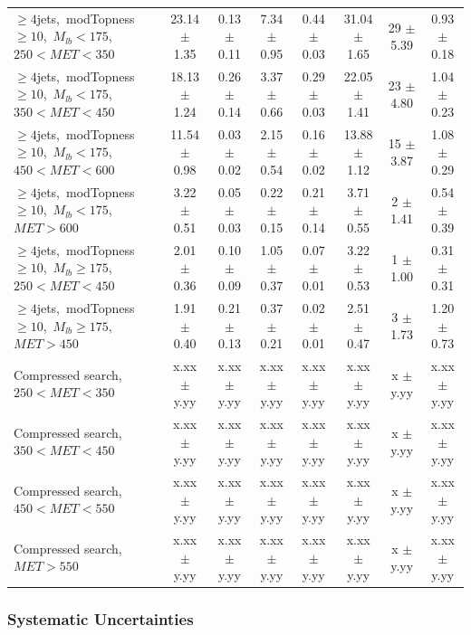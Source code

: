 \begin{table}
{\begin{tabular}{|l|c c c c c|c|c|}
\hline
$\ge4$jets,~modTopness$\ge10$,~$M_{lb}<175$,~$250<MET<350$  & 23.14 $\pm$ 1.35  & 0.13 $\pm$ 0.11  & 7.34 $\pm$ 0.95  & 0.44 $\pm$ 0.03  & 31.04 $\pm$ 1.65  & 29 $\pm$ 5.39  & 0.93 $\pm$ 0.18 \\*
$\ge4$jets,~modTopness$\ge10$,~$M_{lb}<175$,~$350<MET<450$  & 18.13 $\pm$ 1.24  & 0.26 $\pm$ 0.14  & 3.37 $\pm$ 0.66  & 0.29 $\pm$ 0.03  & 22.05 $\pm$ 1.41  & 23 $\pm$ 4.80  & 1.04 $\pm$ 0.23 \\*
$\ge4$jets,~modTopness$\ge10$,~$M_{lb}<175$,~$450<MET<600$  & 11.54 $\pm$ 0.98  & 0.03 $\pm$ 0.02  & 2.15 $\pm$ 0.54  & 0.16 $\pm$ 0.02  & 13.88 $\pm$ 1.12  & 15 $\pm$ 3.87  & 1.08 $\pm$ 0.29 \\*
$\ge4$jets,~modTopness$\ge10$,~$M_{lb}<175$,~$MET>600$  & 3.22 $\pm$ 0.51  & 0.05 $\pm$ 0.03  & 0.22 $\pm$ 0.15  & 0.21 $\pm$ 0.14  & 3.71 $\pm$ 0.55  & 2 $\pm$ 1.41  & 0.54 $\pm$ 0.39 \\*
\hline
$\ge4$jets,~modTopness$\ge10$,~$M_{lb}\ge175$,~$250<MET<450$  & 2.01 $\pm$ 0.36  & 0.10 $\pm$ 0.09  & 1.05 $\pm$ 0.37  & 0.07 $\pm$ 0.01  & 3.22 $\pm$ 0.53  & 1 $\pm$ 1.00  & 0.31 $\pm$ 0.31 \\*
$\ge4$jets,~modTopness$\ge10$,~$M_{lb}\ge175$,~$MET>450$  & 1.91 $\pm$ 0.40  & 0.21 $\pm$ 0.13  & 0.37 $\pm$ 0.21  & 0.02 $\pm$ 0.01  & 2.51 $\pm$ 0.47  & 3 $\pm$ 1.73  & 1.20 $\pm$ 0.73 \\*
\hline
Compressed search, $250<MET<350$  & x.xx $\pm$ y.yy  & x.xx $\pm$ y.yy  & x.xx $\pm$ y.yy  & x.xx $\pm$ y.yy  & x.xx $\pm$ y.yy  & x $\pm$ y.yy  & x.xx $\pm$ y.yy \\*
Compressed search, $350<MET<450$  & x.xx $\pm$ y.yy  & x.xx $\pm$ y.yy  & x.xx $\pm$ y.yy  & x.xx $\pm$ y.yy  & x.xx $\pm$ y.yy  & x $\pm$ y.yy  & x.xx $\pm$ y.yy \\*
Compressed search, $450<MET<550$  & x.xx $\pm$ y.yy  & x.xx $\pm$ y.yy  & x.xx $\pm$ y.yy  & x.xx $\pm$ y.yy  & x.xx $\pm$ y.yy  & x $\pm$ y.yy  & x.xx $\pm$ y.yy \\*
Compressed search, $MET>550$      & x.xx $\pm$ y.yy  & x.xx $\pm$ y.yy  & x.xx $\pm$ y.yy  & x.xx $\pm$ y.yy  & x.xx $\pm$ y.yy  & x $\pm$ y.yy  & x.xx $\pm$ y.yy \\*
\hline
\end{tabular}
}
\end{table}

\subsubsection{Systematic Uncertainties}
\label{sssec:stop:lostlep:systematics}

